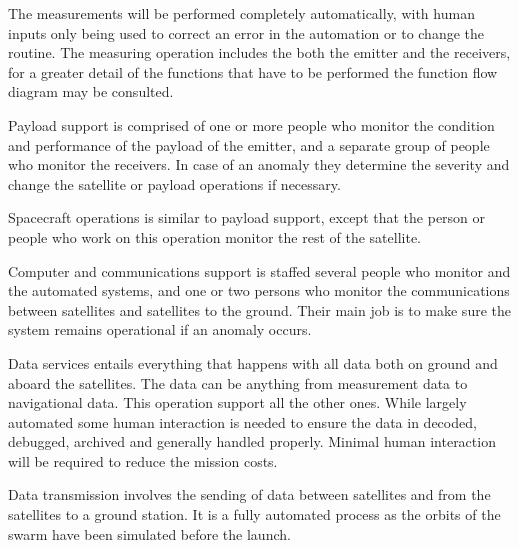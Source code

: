 The measurements will be performed completely automatically, with human inputs only being used to correct an error in the automation or to change the routine. The measuring operation includes the both the emitter and the receivers, for a greater detail of the functions that have to be performed the function flow diagram may be consulted.

Payload support is comprised of one or more people who monitor the condition and performance of the payload of the emitter, and a separate group of people who monitor the receivers. In case of an anomaly they determine the severity and change the satellite or payload operations if necessary.

Spacecraft operations is similar to payload support, except that the person or people who work on this operation monitor the rest of the satellite.

Computer and communications support is staffed several people who monitor and the automated systems, and one or two persons who monitor the communications between satellites and satellites to the ground. Their main job is to make sure the system remains operational if an anomaly occurs.

Data services entails everything that happens with all data both on ground and aboard the satellites. The data can be anything from measurement data to navigational data. This operation support all the other ones. While largely automated some human interaction is needed to ensure the data in decoded, debugged, archived and generally handled properly. Minimal human interaction will be required to reduce the mission costs.

Data transmission involves the sending of data between satellites and from the satellites to a ground station. It is a fully automated process as the orbits of the swarm have been simulated before the launch.
